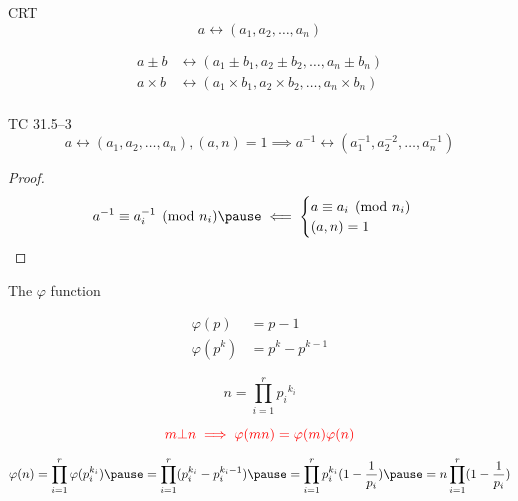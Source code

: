 \begin{frame}{CRT}
  \[
	a \leftrightarrow (a_1, a_2, \ldots, a_n)
  \]

  \begin{align*}
	a \pm b &\leftrightarrow (a_1 \pm b_1, a_2 \pm b_2, \ldots, a_n \pm b_n) \\
	a \times b &\leftrightarrow (a_1 \times b_1, a_2 \times b_2, \ldots, a_n \times b_n) \\
  \end{align*}

  \begin{exampleblock}{TC 31.5--3}
	\[
	 a \leftrightarrow (a_1, a_2, \ldots, a_n), (a,n) = 1 \implies a^{-1} \leftrightarrow (a_1^{-1}, a_2^{-2}, \ldots, a_n^{-1})
	\]
  \end{exampleblock}

  \begin{proof}
	\begin{equation*}
	  a^{-1} \equiv a_i^{-1} \pmod{n_i} \pause \impliedby \begin{cases}
		a \equiv a_i \pmod{n_i} \\
		(a,n) = 1
	  \end{cases}
	\end{equation*}
  \end{proof}
\end{frame}
\begin{frame}{The $\varphi$ function}
  \begin{theorem}
	\begin{align*}
	  \varphi(p) &= p - 1 \\
	  \varphi(p^k) &= p^k - p^{k-1}
	\end{align*}
  \end{theorem}

  \pause

  \[
	n = \prod_{i=1}^{r} {p_i}^{k_i}
  \]

  \pause
  \[
	\textcolor{red}{m \bot n \implies \varphi(mn) = \varphi(m) \varphi(n)}
  \]

  \pause
  \[
	\varphi(n) = \prod_{i=1}^{r} \varphi(p_i^{k_i}) 
	    \pause = \prod_{i=1}^{r} (p_i^{k_i} - p_{i}^{k_i - 1})
		\pause = \prod_{i=1}^{r} p_i^{k_i} (1 - \frac{1}{p_i})
		\pause = n \prod_{i=1}^{r} (1 - \frac{1}{p_i})
  \]
\end{frame}

